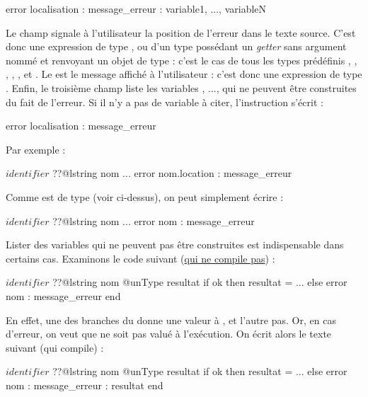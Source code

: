 {
\begin{galgascode}
error localisation : message_erreur : variable1, ..., variableN
\end{galgascode}



Le champ  signale à l'utilisateur la position de l'erreur dans le texte source. C'est donc une expression de type , ou d'un type possédant un \emph{getter} sans argument nommé  et renvoyant un objet de type  : c'est le cas de tous les types prédéfinis , , , , ,  et . Le  est le message affiché à l'utilisateur : c'est donc une expression de type . Enfin, le troisième champ liste les variables , ...,  qui ne peuvent être construites du fait de l'erreur. Si il n'y a pas de variable à citer, l'instruction s'écrit :
\begin{galgascode}
error localisation : message_erreur
\end{galgascode}

Par exemple :

\begin{galgascode}
$identifier$ ??@lstring nom
...
error nom.location : message_erreur
\end{galgascode}

Comme  est de type  (voir ci-dessus), on peut simplement écrire :
\begin{galgascode}
$identifier$ ??@lstring nom
...
error nom : message_erreur
\end{galgascode}


Lister des variables qui ne peuvent pas être construites est indispensable dans certains cas. Examinons le code suivant (\underline{qui ne compile pas}) :
\begin{galgascode}
$identifier$ ??@lstring nom
@unType resultat
if ok then
  resultat = ...
else
  error nom : message_erreur
end
\end{galgascode}

En effet, une des branches du  donne une valeur à , et l'autre pas. Or, en cas d'erreur, on veut que  ne soit pas valué à l'exécution. On écrit alors le texte suivant (qui compile) :
\begin{galgascode}
$identifier$ ??@lstring nom
@unType resultat
if ok then
  resultat = ...
else
  error nom : message_erreur : resultat
end
\end{galgascode}

}
